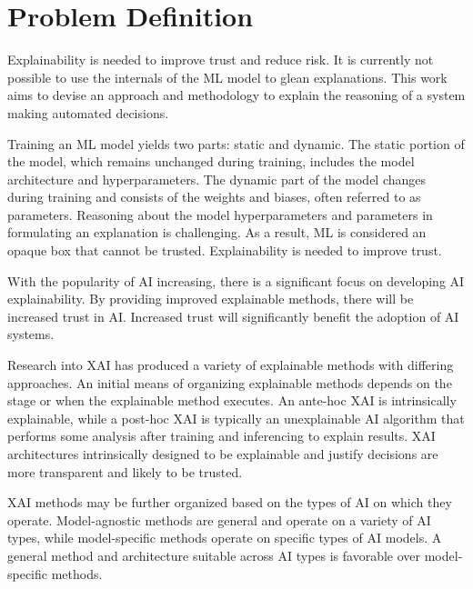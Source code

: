 \section{Problem Definition}


Explainability is needed to improve trust and reduce risk. It is currently not
possible to use the internals of the ML model to glean explanations. This work
aims to devise an approach and methodology to explain the reasoning of a system
making automated decisions.

Training an ML model yields two parts: static and dynamic. The static portion of
the model, which remains unchanged during training, includes the model
architecture and hyperparameters. The dynamic part of the model changes during
training and consists of the weights and biases, often referred to as
parameters. Reasoning about the model hyperparameters and parameters in
formulating an explanation is challenging. As a result, ML is considered an
opaque box that cannot be trusted. Explainability is needed to improve trust.

With the popularity of AI increasing, there is a significant focus on developing
AI explainability\cite{dw2019darpa}. By providing improved explainable methods,
there will be increased trust in AI. Increased trust will significantly benefit
the adoption of AI systems. 

Research into XAI has produced a variety of explainable methods with differing
approaches. An initial means of organizing explainable methods depends on the
stage or when the explainable method executes. An ante-hoc XAI is intrinsically
explainable, while a post-hoc XAI is typically an unexplainable AI algorithm
that performs some analysis after training and inferencing to explain
results\cite{RETZLAFF2024101243}. XAI architectures intrinsically designed to be
explainable and justify decisions are more transparent and likely to be trusted.

XAI methods may be further organized based on the types of AI on which they
operate. Model-agnostic methods are general and operate on a variety of AI
types, while model-specific methods operate on specific types of AI
models\cite{arrieta2020explainable}. A general method and architecture suitable
across AI types is favorable over model-specific methods.

